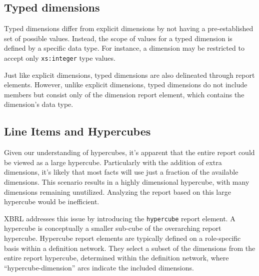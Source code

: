 

\subsection{Typed dimensions}

Typed dimensions differ from explicit dimensions by not having a pre-established set of possible values.
Instead, the scope of values for a typed dimension is defined by a specific data type.
For instance, a dimension may be restricted to accept only \texttt{xs:integer} type values.

Just like explicit dimensions, typed dimensions are also delineated through report elements.
However, unlike explicit dimensions, typed dimensions do not include members but consist only of the dimension report element, which contains the dimension's data type.

\subsection{Line Items and Hypercubes}

Given our understanding of hypercubes, it's apparent that the entire report could be viewed as a large hypercube.
Particularly with the addition of extra dimensions, it's likely that most facts will use just a fraction of the available dimensions.
This scenario results in a highly dimensional hypercube, with many dimensions remaining unutilized.
Analyzing the report based on this large hypercube would be inefficient.

XBRL addresses this issue by introducing the \texttt{hypercube} report element.
A hypercube is conceptually a smaller sub-cube of the overarching report hypercube.
Hypercube report elements are typically defined on a role-specific basis within a definition network.
They select a subset of the dimensions from the entire report hypercube,
determined within the definition network, where “hypercube-dimension” arcs indicate the included dimensions.

